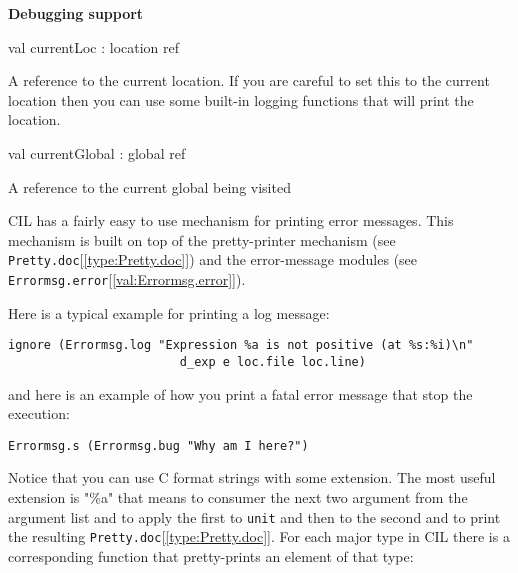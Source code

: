 \documentclass[11pt]{article}
\begin{document}
{\bf Debugging support}



\label{val:Cil.currentLoc}\begin{ocamldoccode}
val currentLoc : location ref
\end{ocamldoccode}
\begin{ocamldocdescription}
A reference to the current location. If you are careful to set this to 
 the current location then you can use some built-in logging functions that 
 will print the location.


\end{ocamldocdescription}




\label{val:Cil.currentGlobal}\begin{ocamldoccode}
val currentGlobal : global ref
\end{ocamldoccode}
\begin{ocamldocdescription}
A reference to the current global being visited


\end{ocamldocdescription}




CIL has a fairly easy to use mechanism for printing error messages. This 
 mechanism is built on top of the pretty-printer mechanism (see 
 {\tt{Pretty.doc}}[\ref{type:Pretty.doc}]) and the error-message modules (see {\tt{Errormsg.error}}[\ref{val:Errormsg.error}]). 


 Here is a typical example for printing a log message: \begin{verbatim}
ignore (Errormsg.log "Expression %a is not positive (at %s:%i)\n"
                        d_exp e loc.file loc.line)
\end{verbatim}


 and here is an example of how you print a fatal error message that stop the 
 execution: \begin{verbatim}
Errormsg.s (Errormsg.bug "Why am I here?")
\end{verbatim}


 Notice that you can use C format strings with some extension. The most 
useful extension is "\%a" that means to consumer the next two argument from 
the argument list and to apply the first to {\tt{unit}} and then to the second 
and to print the resulting {\tt{Pretty.doc}}[\ref{type:Pretty.doc}]. For each major type in CIL there is 
a corresponding function that pretty-prints an element of that type:
\end{document}
